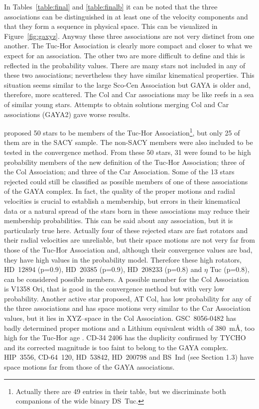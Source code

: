 \documentclass[11pt,twoside]{book}
\begin{document}
In Tables~\ref{table:final} and \ref{table:finalb} it can be noted that the
three associations can be distinguished
in at least one of the velocity components and that they form a
sequence in physical space.
This can be visualized in Figure~\ref{fig:gaxyz}.
Anyway these three associations are not very distinct from one another.
The Tuc-Hor  Association is clearly more compact and closer to what we expect for an association.
The other two are more difficult to define and this is reflected in the probability values.
There are many stars not included in any of these two associations;
nevertheless they have similar kinematical properties.
This situation seems similar to the large Sco-Cen Association but GAYA is older
and, therefore, more scattered.
The Col and Car associations may be like reefs in a sea of similar young stars.
Attempts to obtain solutions merging Col and Car associations (GAYA2)
gave worse results.

\citet{zuckerman04} proposed 50 stars to be members of the Tuc-Hor
Association\footnote{Actually there are 49 entries in their table, but
we discriminate both companions of the wide binary DS~Tuc.}, but only
25 of them are in the SACY sample.  The non-SACY members were also
included to be tested in the convergence method.  From these 50 stars,
31 were found to be high probability members of the new definition of
the Tuc-Hor Association; three of the Col Association; and three of
the Car Association.  Some of the 13 stars rejected could still be
classified as possible members of one of these associations of the
GAYA complex.  In fact, the quality of the proper motions and radial
velocities is crucial to establish a membership, but errors in their
kinematical data or a natural spread of the stars born in these
associations may reduce their membership probabilities.  This can be
said about any association, but it is particularly true here.
Actually four of these rejected stars are fast rotators and their
radial velocities are unreliable, but their space motions are not very
far from those of the Tuc-Hor Association and, although their
convergence values are bad, they have high values in the probability
model.  Therefore these high rotators, HD~12894 (p=0.9), HD~20385
(p=0.9), HD~208233 (p=0.8) and $\eta$ Tuc (p=0.8), can be considered
possible members.  A possible member for the Col Association is V1358
Ori, that is good in the convergence method but with very low
probability.  Another active star proposed, AT Col, has low
probability for any of the three associations and has space motions
very similar to the Car Association values, but it lies in XYZ--space
in the Col Association.  GSC~8056-0482 has badly determined proper
motions and a Lithium equivalent width of 380~m\AA, too high for the
Tuc-Hor age \citep{torres00, zucksb04}.  CD-34 2406 has the duplicity
confirmed by TYCHO and its corrected magnitude is too faint to belong
to the GAYA complex.  HIP~3556, CD-64~120, HD~53842, HD~200798 and
BS~Ind (see Section 1.3) have space motions far from those of the GAYA
associations.
\end{document}
